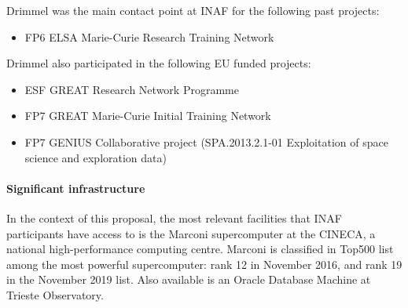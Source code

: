 Drimmel was the main contact point at INAF for the following past projects:
\begin{itemize}
    \item FP6 ELSA Marie-Curie Research Training Network
\end{itemize}
Drimmel also participated in the following EU funded projects: 
\begin{itemize}
    \item ESF GREAT Research Network Programme 
    \item FP7 GREAT Marie-Curie Initial Training Network
    \item FP7 GENIUS Collaborative project (SPA.2013.2.1-01 Exploitation of space science and exploration data)
\end{itemize}


\paragraph{Significant infrastructure}

In the context of this proposal, the most relevant facilities that INAF participants have access to is the Marconi supercomputer at the CINECA, a national high-performance computing centre. Marconi is classified in Top500 list among the most powerful supercomputer:  rank 12 in November 2016, and rank 19 in the November 2019 list. Also available is an Oracle Database Machine at Trieste Observatory.